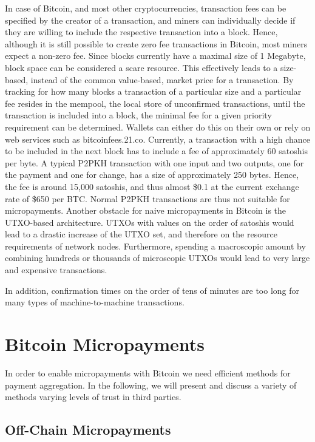 In case of Bitcoin, and most other cryptocurrencies, transaction fees can be specified by the creator of a transaction, and miners can individually decide if they are willing to include the respective transaction into a block. Hence, although it is still possible to create zero fee transactions in Bitcoin, most miners expect a non-zero fee. Since blocks currently have a maximal size of 1 Megabyte, block space can be considered a scare resource. This effectively leads to a size-based, instead of the common value-based, market price for a transaction. By tracking for how many blocks a transaction of a particular size and a particular fee resides in the mempool, the local store of unconfirmed transactions, until the transaction is included into a block, the minimal fee for a given priority requirement can be determined. Wallets can either do this on their own or rely on web services such as bitcoinfees.21.co. 
Currently, a transaction with a high chance to be included in the next block has to include a fee of approximately 60 satoshis per byte. A typical P2PKH transaction with one input and two outputs, one for the payment and one for change, has a size of approximately 250 bytes. Hence, the fee is around 15,000 satoshis, and thus almost \$0.1 at the current exchange rate of \$650 per BTC. 
Normal P2PKH transactions are thus not suitable for micropayments. Another obstacle for naive micropayments in Bitcoin is the UTXO-based architecture. UTXOs with values on the order of satoshis would lead to a drastic increase of the UTXO set, and therefore on the resource requirements of network nodes. Furthermore, spending a macroscopic amount by combining hundreds or thousands of microscopic UTXOs would lead to very large and expensive transactions. 

In addition, confirmation times on the order of tens of minutes are too long for many types of  machine-to-machine transactions.

\section{Bitcoin Micropayments}

In order to enable micropayments with Bitcoin we need efficient methods for payment aggregation. In the following, we will present and discuss a variety of methods varying levels of trust in third parties.

\subsection{Off-Chain Micropayments}

